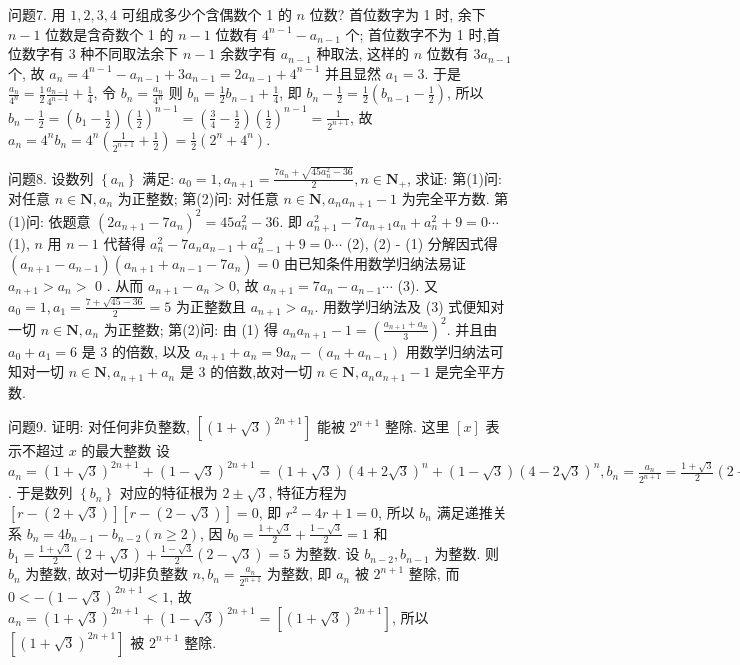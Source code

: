 问题7. 用 $1,2,3,4$ 可组成多少个含偶数个 1 的 $n$ 位数?
首位数字为 1 时, 余下 $n-1$ 位数是含奇数个 1 的 $n-1$ 位数有 $4^{n-1}- a_{n-1}$ 个; 首位数字不为 1 时,首位数字有 3 种不同取法余下 $n-1$ 余数字有 $a_{n-1}$ 种取法, 这样的 $n$ 位数有 $3 a_{n-1}$ 个, 故 $a_n=4^{n-1}-a_{n-1}+3 a_{n-1}=2 a_{n-1}+4^{n-1}$ 并且显然 $a_1=3$. 于是 $\frac{a_n}{4^n}=\frac{1}{2} \frac{a_{n-1}}{4^{n-1}}+\frac{1}{4}$, 令 $b_n=\frac{a_n}{4^n}$ 则 $b_n=\frac{1}{2} b_{n-1}+\frac{1}{4}$, 即 $b_n- \frac{1}{2}=\frac{1}{2}\left(b_{n-1}-\frac{1}{2}\right)$, 所以 $b_n-\frac{1}{2}=\left(b_1-\frac{1}{2}\right)\left(\frac{1}{2}\right)^{n-1}=\left(\frac{3}{4}-\frac{1}{2}\right)\left(\frac{1}{2}\right)^{n-1}= \frac{1}{2^{n+1}}$, 故 $a_n=4^n b_n=4^n\left(\frac{1}{2^{n+1}}+\frac{1}{2}\right)=\frac{1}{2}\left(2^n+4^n\right)$.



问题8. 设数列 $\left\{a_n\right\}$ 满足: $a_0=1, a_{n+1}=\frac{7 a_n+\sqrt{45 a_n^2-36}}{2}, n \in \mathbf{N}_{+}$, 求证:
第(1)问:对任意 $n \in \mathbf{N}, a_n$ 为正整数; 第(2)问: 对任意 $n \in \mathbf{N}, a_n a_{n+1}-1$ 为完全平方数.
第(1)问: 依题意 $\left(2 a_{n+1}-7 a_n\right)^2=45 a_n^2-36$. 即 $a_{n+1}^2-7 a_{n+1} a_n+a_n^2+9= 0 \cdots$ (1), 
$n$ 用 $n-1$ 代替得 $a_n^2-7 a_n a_{n-1}+a_{n-1}^2+9=0 \cdots$ (2), 
(2) - (1) 分解因式得 $\left(a_{n+1}-a_{n-1}\right)\left(a_{n+1}+a_{n-1}-7 a_n\right)=0$ 
由已知条件用数学归纳法易证 $a_{n+1}>a_n>$ 0 . 
从而 $a_{n+1}-a_n>0$, 故 $a_{n+1}=7 a_n-a_{n-1} \cdots$ (3). 
又 $a_0=1, a_1=\frac{7+\sqrt{45-36}}{2} =5$ 为正整数且 $a_{n+1}>a_n$. 
用数学归纳法及 (3) 式便知对一切 $n \in \mathbf{N}, a_n$ 为正整数; 
第(2)问: 由 (1) 得 $a_n a_{n+1}-1=\left(\frac{a_{n+1}+a_n}{3}\right)^2$. 
并且由 $a_0+a_1=6$ 是 3 的倍数, 以及 $a_{n+1}+a_n=9 a_n-\left(a_n+a_{n-1}\right)$ 
用数学归纳法可知对一切 $n \in \mathbf{N}, a_{n+1}+ a_n$ 是 3 的倍数,故对一切 $n \in \mathbf{N}, a_n a_{n+1}-1$ 是完全平方数.



问题9. 证明: 对任何非负整数, $\left[(1+\sqrt{3})^{2 n+1}\right]$ 能被 $2^{n+1}$ 整除.
这里 $[x]$ 表示不超过 $x$ 的最大整数
设 $a_n=(1+\sqrt{3})^{2 n+1}+(1-\sqrt{3})^{2 n+1}=(1+\sqrt{3})(4+2 \sqrt{3})^n+(1-\sqrt{3}) (4-2 \sqrt{3})^n, b_n=\frac{a_n}{2^{n+1}}=\frac{1+\sqrt{3}}{2}(2+\sqrt{3})^n+\frac{1-\sqrt{3}}{2}(2-\sqrt{3})^n \quad n=0,1, \cdots$. 于是数列 $\left\{b_n\right\}$ 对应的特征根为 $2 \pm \sqrt{3}$, 特征方程为 $[r-(2+\sqrt{3})][r-(2- \sqrt{3})]=0$, 即 $r^2-4 r+1=0$, 所以 $b_n$ 满足递推关系 $b_n=4 b_{n-1}-b_{n-2}(n \geqslant 2)$, 因 $b_0=\frac{1+\sqrt{3}}{2}+\frac{1-\sqrt{3}}{2}=1$ 和 $b_1=\frac{1+\sqrt{3}}{2}(2+\sqrt{3})+\frac{1-\sqrt{3}}{2}(2-\sqrt{3})=5$ 为整数.
设 $b_{n-2}, b_{n-1}$ 为整数.
则 $b_n$ 为整数, 故对一切非负整数 $n, b_n=\frac{a_n}{2^{n+1}}$ 为整数, 即 $a_n$ 被 $2^{n+1}$ 整除, 而 $0<-(1-\sqrt{3})^{2 n+1}<1$, 故 $a_n=(1+\sqrt{3})^{2 n+1}+(1- \sqrt{3})^{2 n+1}=\left[(1+\sqrt{3})^{2 n+1}\right]$, 所以 $\left[(1+\sqrt{3})^{2 n+1}\right]$ 被 $2^{n+1}$ 整除.



